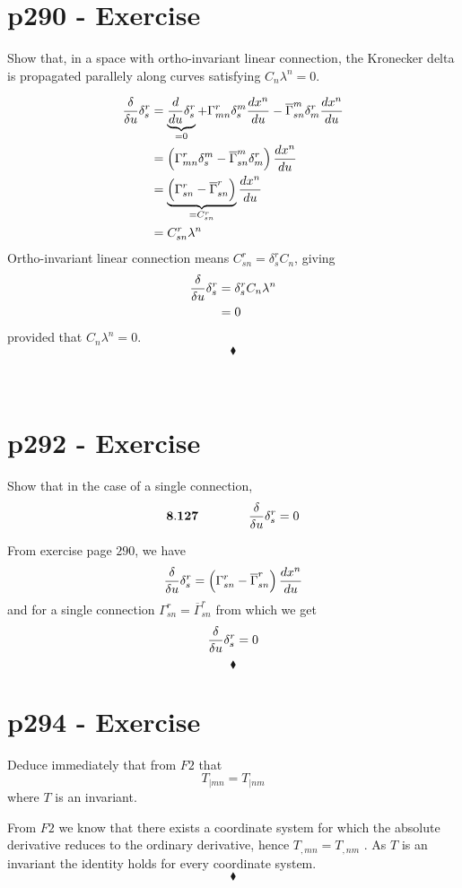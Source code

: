 \section{p290 - Exercise}
\begin{tcolorbox}
Show that, in a space with ortho-invariant linear connection, the Kronecker delta is propagated parallely along curves satisfying $C_n\lambda^n = 0$.
\end{tcolorbox}
 \begin{align*}
 \fdv{}{u}\delta^r_s &= \underbrace{\dv{}{u}\delta^r_s}_{=0}+\Gamma^r_{mn}\delta^m_s\dv{x^n}{u} - \overline{\Gamma}^m_{sn}\delta^r_m\dv{x^n}{u} \\
 &= \left(\Gamma^r_{mn}\delta^m_s - \overline{\Gamma}^m_{sn}\delta^r_m\right)\dv{x^n}{u} \\
 &=\underbrace{ \left(\Gamma^r_{sn} - \overline{\Gamma}^r_{sn}\right)}_{=C^r_{sn}}\dv{x^n}{u}\\
 &=C^r_{sn}\lambda^n 
 \end{align*}
 Ortho-invariant linear connection means $C^r_{sn}=\delta^r_s C_n$, giving
  \begin{align*}
 \fdv{}{u}\delta^r_s &= \delta^r_s C_n\lambda^n \\
 &=0
 \end{align*}
 provided that $C_n\lambda^n = 0$.
$$\blacklozenge$$\\\\



\section{p292 - Exercise}
\begin{tcolorbox}
Show that in the case of a single connection,
$$\mathbf{8.127}  \spatie \fdv{}{u}\delta^r_s =0$$
\end{tcolorbox}
 From exercise page $290$, we have
 $$\fdv{}{u}\delta^r_s =  \left(\Gamma^r_{sn} - \overline{\Gamma}^r_{sn}\right)\dv{x^n}{u}$$ and for a single connection $\Gamma^r_{sn} = \overline{\Gamma}^r_{sn}$ from which we get
 $$\fdv{}{u}\delta^r_s =  0$$
$$\blacklozenge$$
\newpage



\section{p294 - Exercise}
\begin{tcolorbox}
Deduce immediately that from $F2$ that
$$T_{|mn}= T_{|nm}$$ where $T$ is an invariant.
\end{tcolorbox}
 From $F2$ we know that there exists a coordinate system for which the absolute derivative reduces to the ordinary derivative, hence $T_{,mn}= T_{,nm}$ . As $T$ is an invariant the identity holds for every coordinate system.
$$\blacklozenge$$\\

